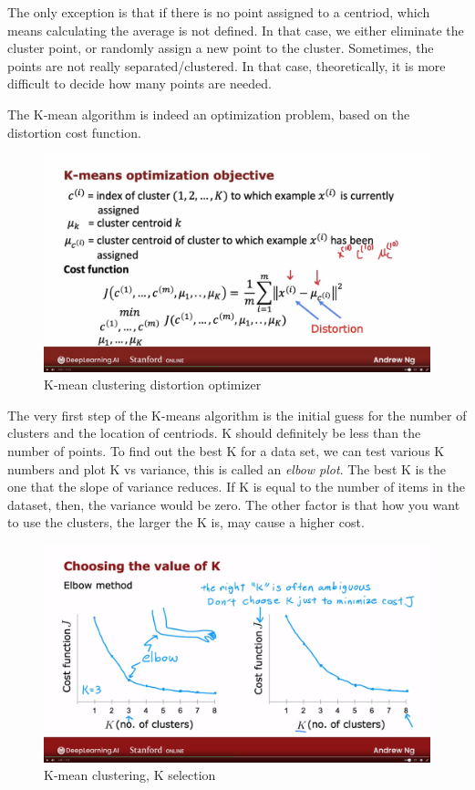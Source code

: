 \documentclass[12pt]{report}
\begin{document}
The only exception is that if there is no point assigned to a centriod, which means calculating the average is not defined. In that case, we either eliminate the cluster point, or randomly assign a new point to the cluster. Sometimes, the points are not really separated/clustered. In that case, theoretically, it is more difficult to decide how many points are needed.


The K-mean algorithm is indeed an optimization problem, based on the distortion cost function.

\begin{figure}[H]
  \centering
  \includegraphics[trim =0.0cm 0.0cm 0.0cm 0.0cm, clip, scale=0.15]{pics/distortion.png}
  \caption{K-mean clustering distortion optimizer}
\end{figure}




The very first step of the K-means algorithm is the initial guess for the number of clusters and the location of centriods. K should definitely be less than the number of points. To find out the best K for a data set, we can test various K numbers and plot K vs variance, this is called an \textit{elbow plot}. The best K is the one that the slope of variance reduces. If K is equal to the number of items in the dataset, then, the variance would be zero. The other factor is that how you want to use the clusters, the larger the K is, may cause a higher cost.

\begin{figure}[H]
  \centering
  \includegraphics[trim =0.0cm 0.0cm 0.0cm 0.0cm, clip, scale=0.15]{pics/elbow.png}
  \caption{K-mean clustering, K selection}
\end{figure}
\end{document}
